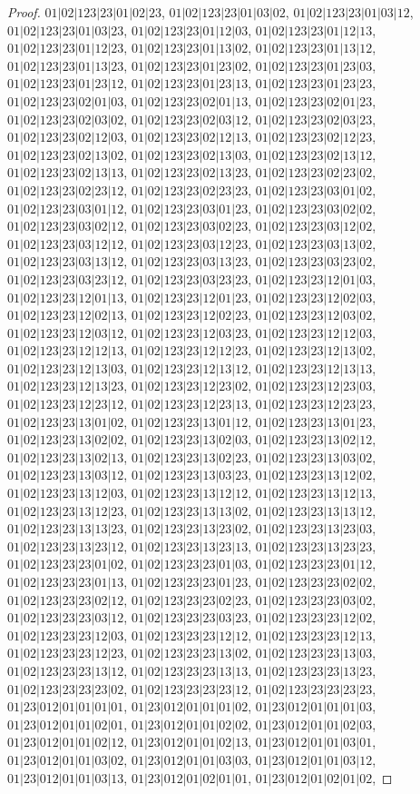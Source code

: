 \documentclass[12pt]{article}
\theoremstyle{plain}
\theoremstyle{definition}
\theoremstyle{remark}
\begin{document}
\begin{proof}
$01|02|123|23|01|02|23$, $01|02|123|23|01|03|02$, $01|02|123|23|01|03|12$, $01|02|123|23|01|03|23$, $01|02|123|23|01|12|03$, $01|02|123|23|01|12|13$, $01|02|123|23|01|12|23$, $01|02|123|23|01|13|02$, $01|02|123|23|01|13|12$, $01|02|123|23|01|13|23$, $01|02|123|23|01|23|02$, $01|02|123|23|01|23|03$, $01|02|123|23|01|23|12$, $01|02|123|23|01|23|13$, $01|02|123|23|01|23|23$, $01|02|123|23|02|01|03$, $01|02|123|23|02|01|13$, $01|02|123|23|02|01|23$, $01|02|123|23|02|03|02$, $01|02|123|23|02|03|12$, $01|02|123|23|02|03|23$, $01|02|123|23|02|12|03$, $01|02|123|23|02|12|13$, $01|02|123|23|02|12|23$, $01|02|123|23|02|13|02$, $01|02|123|23|02|13|03$, $01|02|123|23|02|13|12$, $01|02|123|23|02|13|13$, $01|02|123|23|02|13|23$, $01|02|123|23|02|23|02$, $01|02|123|23|02|23|12$, $01|02|123|23|02|23|23$, $01|02|123|23|03|01|02$, $01|02|123|23|03|01|12$, $01|02|123|23|03|01|23$, $01|02|123|23|03|02|02$, $01|02|123|23|03|02|12$, $01|02|123|23|03|02|23$, $01|02|123|23|03|12|02$, $01|02|123|23|03|12|12$, $01|02|123|23|03|12|23$, $01|02|123|23|03|13|02$, $01|02|123|23|03|13|12$, $01|02|123|23|03|13|23$, $01|02|123|23|03|23|02$, $01|02|123|23|03|23|12$, $01|02|123|23|03|23|23$, $01|02|123|23|12|01|03$, $01|02|123|23|12|01|13$, $01|02|123|23|12|01|23$, $01|02|123|23|12|02|03$, $01|02|123|23|12|02|13$, $01|02|123|23|12|02|23$, $01|02|123|23|12|03|02$, $01|02|123|23|12|03|12$, $01|02|123|23|12|03|23$, $01|02|123|23|12|12|03$, $01|02|123|23|12|12|13$, $01|02|123|23|12|12|23$, $01|02|123|23|12|13|02$, $01|02|123|23|12|13|03$, $01|02|123|23|12|13|12$, $01|02|123|23|12|13|13$, $01|02|123|23|12|13|23$, $01|02|123|23|12|23|02$, $01|02|123|23|12|23|03$, $01|02|123|23|12|23|12$, $01|02|123|23|12|23|13$, $01|02|123|23|12|23|23$, $01|02|123|23|13|01|02$, $01|02|123|23|13|01|12$, $01|02|123|23|13|01|23$, $01|02|123|23|13|02|02$, $01|02|123|23|13|02|03$, $01|02|123|23|13|02|12$, $01|02|123|23|13|02|13$, $01|02|123|23|13|02|23$, $01|02|123|23|13|03|02$, $01|02|123|23|13|03|12$, $01|02|123|23|13|03|23$, $01|02|123|23|13|12|02$, $01|02|123|23|13|12|03$, $01|02|123|23|13|12|12$, $01|02|123|23|13|12|13$, $01|02|123|23|13|12|23$, $01|02|123|23|13|13|02$, $01|02|123|23|13|13|12$, $01|02|123|23|13|13|23$, $01|02|123|23|13|23|02$, $01|02|123|23|13|23|03$, $01|02|123|23|13|23|12$, $01|02|123|23|13|23|13$, $01|02|123|23|13|23|23$, $01|02|123|23|23|01|02$, $01|02|123|23|23|01|03$, $01|02|123|23|23|01|12$, $01|02|123|23|23|01|13$, $01|02|123|23|23|01|23$, $01|02|123|23|23|02|02$, $01|02|123|23|23|02|12$, $01|02|123|23|23|02|23$, $01|02|123|23|23|03|02$, $01|02|123|23|23|03|12$, $01|02|123|23|23|03|23$, $01|02|123|23|23|12|02$, $01|02|123|23|23|12|03$, $01|02|123|23|23|12|12$, $01|02|123|23|23|12|13$, $01|02|123|23|23|12|23$, $01|02|123|23|23|13|02$, $01|02|123|23|23|13|03$, $01|02|123|23|23|13|12$, $01|02|123|23|23|13|13$, $01|02|123|23|23|13|23$, $01|02|123|23|23|23|02$, $01|02|123|23|23|23|12$, $01|02|123|23|23|23|23$, $01|23|012|01|01|01|01$, $01|23|012|01|01|01|02$, $01|23|012|01|01|01|03$, $01|23|012|01|01|02|01$, $01|23|012|01|01|02|02$, $01|23|012|01|01|02|03$, $01|23|012|01|01|02|12$, $01|23|012|01|01|02|13$, $01|23|012|01|01|03|01$, $01|23|012|01|01|03|02$, $01|23|012|01|01|03|03$, $01|23|012|01|01|03|12$, $01|23|012|01|01|03|13$, $01|23|012|01|02|01|01$, $01|23|012|01|02|01|02$, 
\end{proof}
\end{document}
